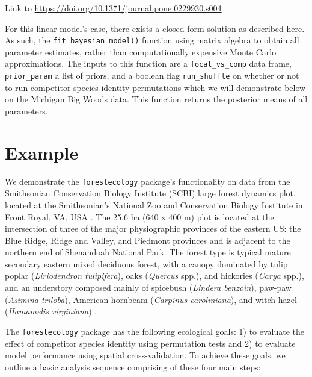 \documentclass[12pt]{article}
\begin{document}
Link to \url{https://doi.org/10.1371/journal.pone.0229930.s004}

For this linear model's case, there exists a closed form solution as
described here. As such, the \texttt{fit\_bayesian\_model()} function
using matrix algebra to obtain all parameter estimates, rather than
computationally expensive Monte Carlo approximations. The inputs to this
function are a \texttt{focal\_vs\_comp} data frame,
\texttt{prior\_param} a list of priors, and a boolean flag
\texttt{run\_shuffle} on whether or not to run competitor-species
identity permutations which we will demonstrate below on the Michigan
Big Woods data. This function returns the posterior means of all
parameters.

\hypertarget{example}{%
\section{Example}\label{example}}

We demonstrate the \texttt{forestecology} package's functionality on
data from the Smithsonian Conservation Biology Institute (SCBI) large
forest dynamics plot, located at the Smithsonian's National Zoo and
Conservation Biology Institute in Front Royal, VA, USA
\citet{bourg_initial_2013}. The 25.6 ha (640 x 400 m) plot is located at
the intersection of three of the major physiographic provinces of the
eastern US: the Blue Ridge, Ridge and Valley, and Piedmont provinces and
is adjacent to the northern end of Shenandoah National Park. The forest
type is typical mature secondary eastern mixed deciduous forest, with a
canopy dominated by tulip poplar (\emph{Liriodendron tulipifera}), oaks
(\emph{Quercus} spp.), and hickories (\emph{Carya} spp.), and an
understory composed mainly of spicebush (\emph{Lindera benzoin}),
paw-paw (\emph{Asimina triloba}), American hornbeam (\emph{Carpinus
caroliniana}), and witch hazel (\emph{Hamamelis virginiana})
\citet{bourg_initial_2013}.

The \texttt{forestecology} package has the following ecological goals:
1) to evaluate the effect of competitor species identity using
permutation tests and 2) to evaluate model performance using spatial
cross-validation. To achieve these goals, we outline a basic analysis
sequence comprising of these four main steps:
\end{document}
